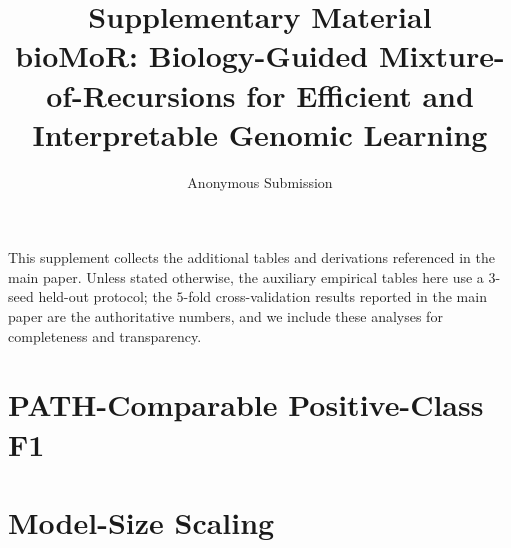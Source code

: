 \documentclass[letterpaper]{article}
\title{Supplementary Material\\
bioMoR: Biology-Guided Mixture-of-Recursions for Efficient and Interpretable Genomic Learning}
\author{Anonymous Submission}
\begin{document}
\maketitle
\appendix

\noindent This supplement collects the additional tables and derivations referenced in the
main paper. Unless stated otherwise, the auxiliary empirical tables here use a $3$-seed
held-out protocol; the $5$-fold cross-validation results reported in the main paper are the
authoritative numbers, and we include these analyses for completeness and transparency.


\section{PATH-Comparable Positive-Class F1}
\label{app:posf1}
\begin{table}[t]
\centering
{}
\caption{\textbf{PATH-comparable positive-class F1 on the multi-omics cohorts.} Each
cell is the threshold-calibrated positive-class (progression: metastatic / late-stage)
F1, mean\,$\pm$\,SD over the folds (\%), for the full efficiency ladder --- the
positive-class counterpart of the macro-F1 main-results table (Table~2 of the main paper). Following the
PATH protocol, the operating threshold is tuned on validation to maximise positive-class
F1 and applied to the held-out test fold, with AUROC-based model selection; all other
settings match the main-results table. PM, PC and 3M are the pan-cancer cohorts under mutation$+$CNV, expression, and
tri-modal (all three) inputs; Bladder/Stomach are the BLCA/STAD Reactome cancers.}
\label{tab:posf1}
\end{table}

\section{Model-Size Scaling}
\label{app:scaling}
\begin{table}[t]
\centering
{}
\caption{\textbf{Model-size scaling.} Macro-F1 (mean$\pm$SD) across a width sweep
($d_{\mathrm{model}}\in\{96,\dots,352\}$) for Vanilla, MoR-general and bioMoR, averaged over
the $8$ single-cell and $3$ Reactome multi-omics suites. bioMoR holds a flat, high accuracy across widths
while the vanilla stack---at $4\times$ the recursion-stack parameters---degrades.}
\label{fig:scaling_cv5}
\end{table}
\end{document}
